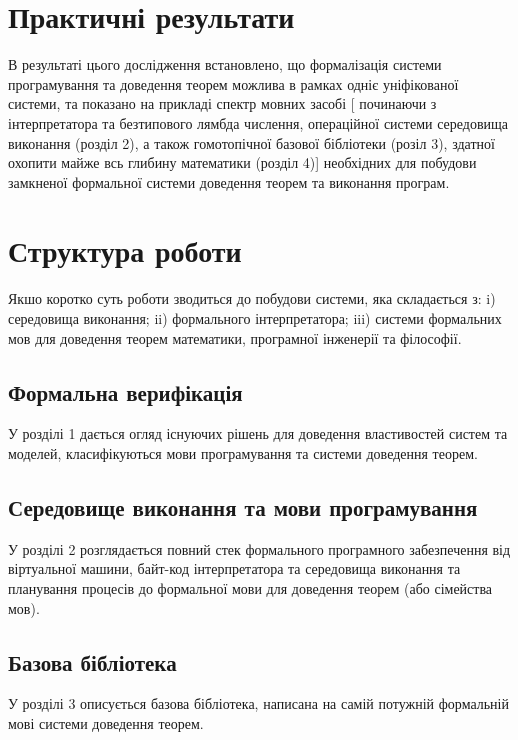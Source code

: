 \section*{Практичні результати}

В результаті цього дослідження встановлено, що формалізація системи
програмування та доведення теорем можлива в рамках одніє уніфікованої
системи, та показано на прикладі спектр мовних засобі [ починаючи з інтерпретатора
та безтипового лямбда числення, операційної системи середовища виконання (розділ 2),
а також гомотопічної базової бібліотеки (розіл 3), здатної охопити майже всь
глибину математики (розділ 4)] необхідних для побудови замкненої формальної системи
доведення теорем та виконання програм.

\section*{Структура роботи}

Якшо коротко суть роботи зводиться до побудови системи, яка складається з:
i) середовища виконання; ii) формального інтерпретатора; iii) системи формальних мов
для доведення теорем математики, програмної інженерії та філософії.

\subsection*{Формальна верифікація}

У розділі 1 дається огляд існуючих рішень для доведення
властивостей систем та моделей, класифікуються мови програмування
та системи доведення теорем.

\subsection*{Середовище виконання та мови програмування}

У розділі 2 розглядається повний стек формального програмного забезпечення
від віртуальної машини, байт-код інтерпретатора та середовища виконання
та планування процесів до формальної мови для доведення теорем (або сімейства мов).

\subsection*{Базова бібліотека}

У розділі 3 описується базова бібліотека, написана на самій потужній
формальній мові системи доведення теорем.

